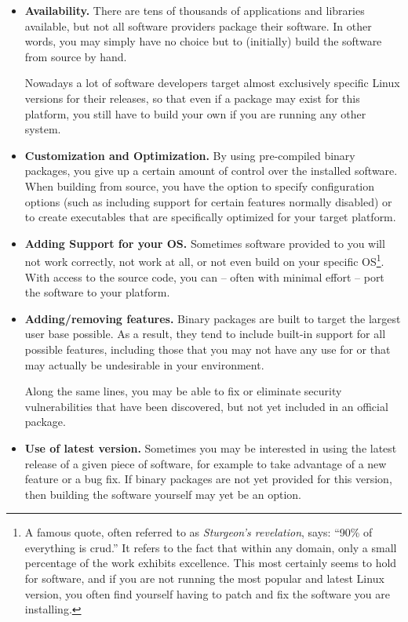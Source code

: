 \begin{itemize}
	\item {\bf Availability.}  There are tens of thousands of
		applications and libraries available, but not all software
		providers package their software.  In other
		words, you may simply have no choice but to (initially)
		build the software from source by hand.

		Nowadays a lot of software developers target almost
		exclusively specific Linux versions for their releases, so
		that even if a package may exist for this platform, you
		still have to build your own if you are running any other
		system.

	\item {\bf Customization and Optimization.}  By using pre-compiled
		binary packages, you give up a certain amount of control
		over the installed software.  When building 
		from source, you have the option to specify configuration
		options (such as including support for certain features
		normally disabled) or to create executables that are
		specifically optimized for your target platform.

	\item {\bf Adding Support for your OS.}  Sometimes software
		provided to you will not work correctly, not work
		at all, or not even build on your specific OS\footnote{A
		famous quote, often referred to as {\em
		Sturgeon's revelation}, says: ``90\%
		of everything is crud.'' It refers to the
		fact that within any domain, only a small percentage of
		the work exhibits excellence.  This most certainly seems to
		hold for software, and if you are not running the most popular and
		latest Linux version, you often find yourself having to patch and
		fix the software you are installing.}.  With access to
		the source code, you can -- often with minimal effort -- port
		the software to your platform.

	\item {\bf Adding/removing features.}  Binary packages are built
		to target the largest user base possible.  As a result,
		they tend to include built-in support for all possible
		features, including those that you may not have any use
		for or that may actually be undesirable in your
		environment.

		Along the same lines, you may be able to fix or eliminate
		security vulnerabilities that have been discovered, but
		not yet included in an official package.

	\item {\bf Use of latest version.}  Sometimes you may be
		interested in using the latest release of a given piece of
		software, for example to take advantage of a new feature
		or a bug fix.  If binary packages are not yet provided for
		this version, then building the software yourself may yet
		be an option.


\end{itemize}
